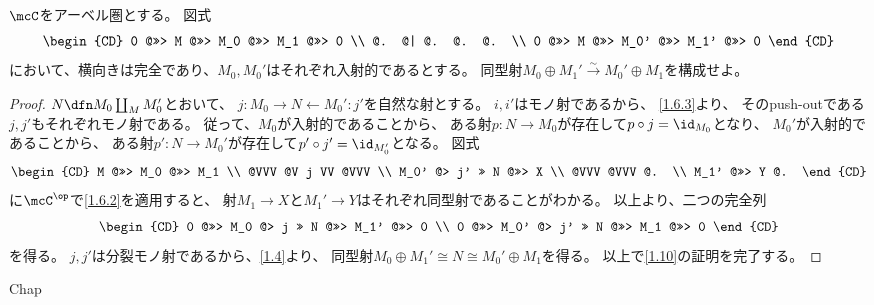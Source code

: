 \documentclass[uplatex,dvipdfmx]{jsarticle}
\begin{document}
\maketitle
\HeaderCommentA
\section{}
\fi


\begin{prob}\label{1.10}
  \(\mcC\)をアーベル圏とする。
  図式
  \[
  \begin{CD}
    0 @>>> M @>>> M_0 @>>> M_1 @>>> 0 \\
    @. @| @. @. @. \\
    0 @>>> M @>>> M_0' @>>> M_1' @>>> 0
  \end{CD}
  \]
  において、横向きは完全であり、\(M_0,M_0'\)はそれぞれ入射的であるとする。
  同型射\(M_0\oplus M_1' \xrightarrow{\sim} M_0'\oplus M_1\)を構成せよ。
\end{prob}

\begin{proof}
  \(N\dfn M_0\coprod_M M_0'\)とおいて、
  \(j:M_0 \to N \gets M_0':j'\)を自然な射とする。
  \(i,i'\)はモノ射であるから、
  \autoref{1.6.3}より、
  そのpush-outである\(j,j'\)もそれぞれモノ射である。
  従って、\(M_0\)が入射的であることから、
  ある射\(p:N\to M_0\)が存在して\(p\circ j = \id_{M_0}\)となり、
  \(M_0'\)が入射的であることから、
  ある射\(p':N\to M_0'\)が存在して\(p'\circ j' = \id_{M_0'}\)となる。
  図式
  \[
  \begin{CD}
    M @>>> M_0 @>>> M_1 \\
    @VVV @V j VV @VVV \\
    M_0' @> j' >> N @>>> X \\
    @VVV @VVV @. \\
    M_1' @>>> Y @.
  \end{CD}
  \]
  に\(\mcC^{\op}\)で\autoref{1.6.2}を適用すると、
  射\(M_1\to X\)と\(M_1'\to Y\)はそれぞれ同型射であることがわかる。
  以上より、二つの完全列
  \[
  \begin{CD}
    0 @>>> M_0 @> j >> N @>>> M_1' @>>> 0 \\
    0 @>>> M_0' @> j' >> N @>>> M_1 @>>> 0
  \end{CD}
  \]
  を得る。
  \(j,j'\)は分裂モノ射であるから、\autoref{1.4}より、
  同型射\(M_0\oplus M_1' \cong N \cong M_0'\oplus M_1\)を得る。
  以上で\autoref{1.10}の証明を完了する。
\end{proof}





\ifcsname Chap\endcsname\else
\printbibliography
\end{document}
